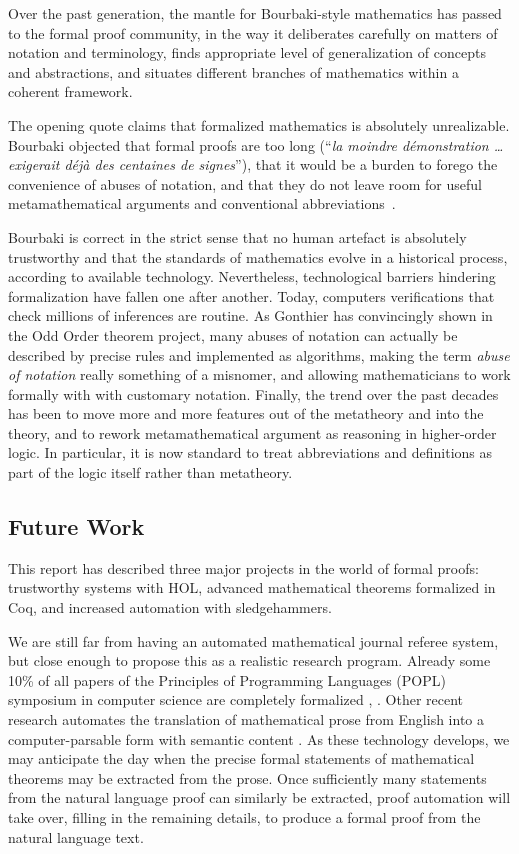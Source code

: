\documentclass[brochure,english,12pt]{bourbaki}
\theoremstyle{plain}
\begin{document}
Over the past generation, the mantle for Bourbaki-style mathematics has  passed to the formal proof community, in the way it
 deliberates carefully on matters of notation and terminology, finds
appropriate level of generalization of concepts and abstractions, and
situates different branches of mathematics within a coherent framework.

The opening quote claims that formalized mathematics is absolutely unrealizable.
Bourbaki objected that formal proofs are too long (``{\it la moindre d\'emonstration \ldots
exigerait d\'ej\`a des centaines de signes}''), that it would be a burden to forego 
the convenience of abuses of notation, and that they do not leave room for useful metamathematical
arguments and conventional abbreviations~\cite{bourbaki1966theorie}.

Bourbaki is correct in the strict sense that no human artefact is absolutely trustworthy and that
the standards of mathematics evolve in a historical process, according to available technology.
Nevertheless,  technological barriers hindering formalization have fallen one
after another.  Today, computers verifications that
check millions of inferences are routine.
As Gonthier has convincingly shown in the Odd Order theorem project, 
many abuses of notation can actually be described by precise rules and implemented as algorithms,
making the term {\it abuse of notation} really something of a misnomer, and
allowing mathematicians to work formally with with customary notation.
Finally, the 
trend over the past decades has been to move more and more features out of the metatheory and into the theory, and to
rework metamathematical argument as reasoning in higher-order logic.  In particular, it is now
standard to treat abbreviations and definitions as part of the logic itself rather than metatheory.

\subsection{Future Work}

This report has described three major projects in the world of formal proofs:
 trustworthy systems with HOL,  advanced mathematical theorems formalized
in Coq, and  increased automation with sledgehammers.   

We are still far from having an automated mathematical journal referee system, but close enough
to propose this as a realistic research program.  Already some 10\% of all papers of the
Principles of Programming Languages (POPL) 
symposium in computer science are completely formalized \cite{SewPOPL2014}, \cite{aydemir2005mechanized}.
Other recent research automates the translation of mathematical prose from English
into a computer-parsable form with semantic content \cite{ganesalingam2013language}.
As these technology develops, we may anticipate the day when the precise formal statements of mathematical
theorems may be extracted from the prose.  Once sufficiently many statements from the natural language proof 
can similarly be extracted, proof automation will take over, filling in the remaining details, to produce
a formal proof from the natural language text.
\end{document}
